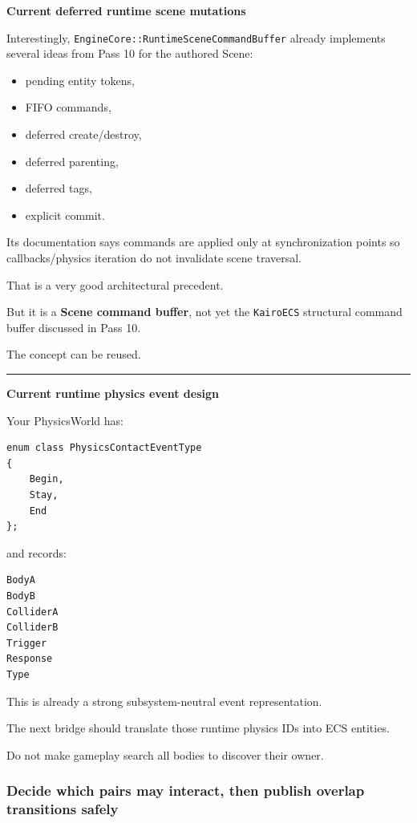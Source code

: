 \textbf{Current deferred runtime scene mutations}

Interestingly, \texttt{EngineCore::RuntimeSceneCommandBuffer} already implements several ideas from Pass 10 for the authored Scene:

\begin{itemize}
\tightlist
\item
  pending entity tokens,
\item
  FIFO commands,
\item
  deferred create/destroy,
\item
  deferred parenting,
\item
  deferred tags,
\item
  explicit commit.
\end{itemize}

Its documentation says commands are applied only at synchronization points so callbacks/physics iteration do not invalidate scene traversal.

That is a very good architectural precedent.

But it is a \textbf{Scene command buffer}, not yet the \texttt{KairoECS} structural command buffer discussed in Pass 10.

The concept can be reused.

\begin{center}\rule{0.5\linewidth}{0.5pt}\end{center}

\textbf{Current runtime physics event design}

Your PhysicsWorld has:

\begin{verbatim}
enum class PhysicsContactEventType
{
    Begin,
    Stay,
    End
};
\end{verbatim}

and records:

\begin{verbatim}
BodyA
BodyB
ColliderA
ColliderB
Trigger
Response
Type
\end{verbatim}

This is already a strong subsystem-neutral event representation.

The next bridge should translate those runtime physics IDs into ECS entities.

Do not make gameplay search all bodies to discover their owner.

\subsubsection{Decide which pairs may interact, then publish overlap transitions safely}\label{decide-which-pairs-may-interact-then-publish-overlap-transitions-safely}

